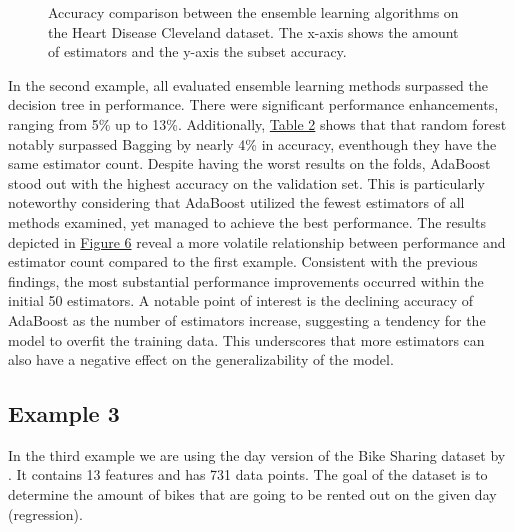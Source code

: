 

\begin{figure}[htbp]
    \centering
    \label{fig:hdc_comparison}
    \caption{
        Accuracy comparison between the ensemble learning algorithms on the Heart Disease Cleveland dataset.
        The x-axis shows the amount of estimators and the y-axis the subset accuracy.
    }
\end{figure}

In the second example, all evaluated ensemble learning methods surpassed the decision tree in performance.
There were significant performance enhancements, ranging from 5\% up to 13\%.
Additionally, \hyperref[tab:hdc_table]{Table 2} shows that that random forest notably surpassed Bagging by
nearly 4\% in accuracy, eventhough they have the same estimator count.
Despite having the worst results on the folds, AdaBoost stood out with the highest accuracy on the validation set.
This is particularly noteworthy considering that AdaBoost utilized the fewest estimators of all methods examined,
yet managed to achieve the best performance.
The results depicted in \hyperref[fig:hdc_comparison]{Figure 6} reveal a more volatile relationship between
performance and estimator count compared to the first example. Consistent with the previous findings, the most
substantial performance improvements occurred within the initial 50 estimators.
A notable point of interest is the declining accuracy of AdaBoost as the number of estimators increase, suggesting
a tendency for the model to overfit the training data.
This underscores that more estimators can also have a negative effect on the generalizability of the model. 

\newpage %
\subsection{Example 3}
In the third example we are using the day version of the Bike Sharing dataset by
\citet*{bike_sharing}. It contains 13 features and has 731 data 
points. The goal of the dataset is to determine the amount of bikes that are going
to be rented out on the given day (regression).

